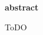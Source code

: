 

\pagestyle{empty}

\begin{latin}

\EnglishAbstractFont

\begin{center}
\textbf{abstract}
\end{center}

ToDO

\end{latin}

\newpage

